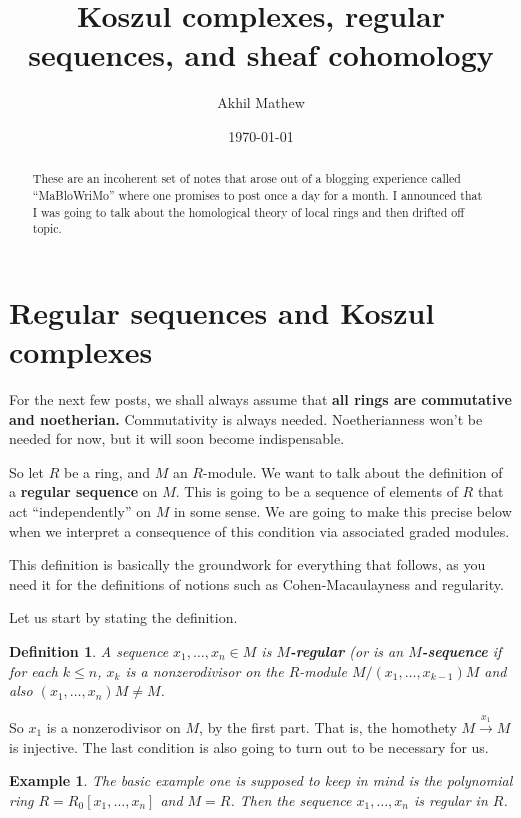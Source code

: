 \documentclass{article}
\title{Koszul complexes, regular sequences, and sheaf cohomology}
\author{Akhil Mathew}
\date{\today}
\newtheorem{definition}{Definition}
\newtheorem{example}{Example}
\begin{document}
\maketitle

\begin{abstract}
These are an incoherent set of notes that arose out of a blogging experience
called ``MaBloWriMo'' where one promises to post once a day for a month. I
announced that I was going to talk about the homological theory of local rings
and then drifted off topic. 
\end{abstract}

\section{Regular sequences and Koszul complexes}
For the next few posts, we shall always assume that \textbf{all rings are
commutative and noetherian.} Commutativity is always needed. Noetherianness
won't be needed for now, but it will soon become indispensable. 

So let $R$ be a ring, and $M$ an $R$-module. We want to talk about the
definition of a \textbf{regular sequence} on $M$. This is going to be a
sequence of elements of $R$ that act ``independently'' on $M$ in some sense. We
are going to make this precise below when we interpret a consequence of this
condition via associated graded modules.

This definition is basically the groundwork for everything that follows, as you
need it for the definitions of notions such as Cohen-Macaulayness and
regularity.

Let us start by stating the definition.
\begin{definition} 
A sequence $x_1, \dots, x_n \in M$ is \textbf{$M$-regular} (or is an
\textbf{$M$-sequence} if for each $k \leq n$, $x_k$ is a nonzerodivisor on the
$R$-module $M/(x_1, \dots, x_{k-1}) M$ and also $(x_1, \dots, x_n) M \neq M$. 	\end{definition} 

So $x_1$ is a nonzerodivisor on $M$, by the first part. That is, the homothety
$M \stackrel{x_1}{\to} M$ is injective. 
The last condition is also going to turn out to be necessary for us.

\begin{example} 
The basic example one is supposed to keep in mind is the polynomial ring $R =
R_0[x_1, \dots, x_n]$ and $M = R$. Then the sequence $x_1, \dots, x_n$ is
regular in $R$.
\end{example} 
\end{document}
